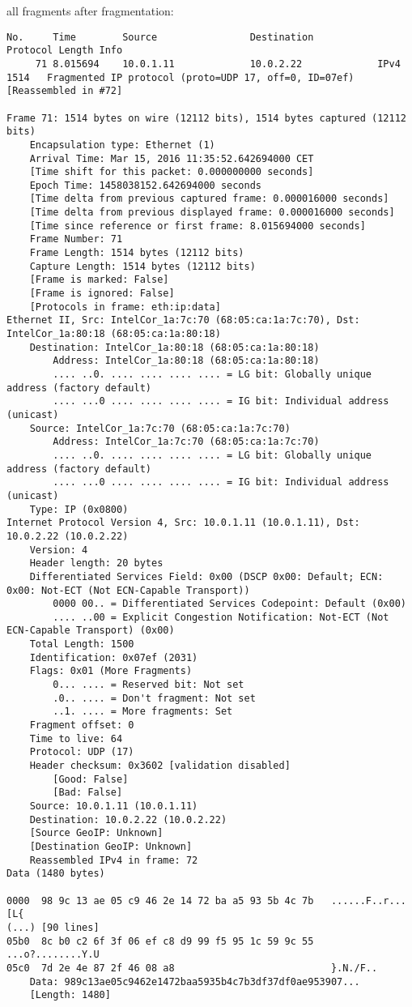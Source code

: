 all fragments after fragmentation:
\begin{lstlisting}
No.     Time        Source                Destination           Protocol Length Info
     71 8.015694    10.0.1.11             10.0.2.22             IPv4     1514   Fragmented IP protocol (proto=UDP 17, off=0, ID=07ef) [Reassembled in #72]

Frame 71: 1514 bytes on wire (12112 bits), 1514 bytes captured (12112 bits)
    Encapsulation type: Ethernet (1)
    Arrival Time: Mar 15, 2016 11:35:52.642694000 CET
    [Time shift for this packet: 0.000000000 seconds]
    Epoch Time: 1458038152.642694000 seconds
    [Time delta from previous captured frame: 0.000016000 seconds]
    [Time delta from previous displayed frame: 0.000016000 seconds]
    [Time since reference or first frame: 8.015694000 seconds]
    Frame Number: 71
    Frame Length: 1514 bytes (12112 bits)
    Capture Length: 1514 bytes (12112 bits)
    [Frame is marked: False]
    [Frame is ignored: False]
    [Protocols in frame: eth:ip:data]
Ethernet II, Src: IntelCor_1a:7c:70 (68:05:ca:1a:7c:70), Dst: IntelCor_1a:80:18 (68:05:ca:1a:80:18)
    Destination: IntelCor_1a:80:18 (68:05:ca:1a:80:18)
        Address: IntelCor_1a:80:18 (68:05:ca:1a:80:18)
        .... ..0. .... .... .... .... = LG bit: Globally unique address (factory default)
        .... ...0 .... .... .... .... = IG bit: Individual address (unicast)
    Source: IntelCor_1a:7c:70 (68:05:ca:1a:7c:70)
        Address: IntelCor_1a:7c:70 (68:05:ca:1a:7c:70)
        .... ..0. .... .... .... .... = LG bit: Globally unique address (factory default)
        .... ...0 .... .... .... .... = IG bit: Individual address (unicast)
    Type: IP (0x0800)
Internet Protocol Version 4, Src: 10.0.1.11 (10.0.1.11), Dst: 10.0.2.22 (10.0.2.22)
    Version: 4
    Header length: 20 bytes
    Differentiated Services Field: 0x00 (DSCP 0x00: Default; ECN: 0x00: Not-ECT (Not ECN-Capable Transport))
        0000 00.. = Differentiated Services Codepoint: Default (0x00)
        .... ..00 = Explicit Congestion Notification: Not-ECT (Not ECN-Capable Transport) (0x00)
    Total Length: 1500
    Identification: 0x07ef (2031)
    Flags: 0x01 (More Fragments)
        0... .... = Reserved bit: Not set
        .0.. .... = Don't fragment: Not set
        ..1. .... = More fragments: Set
    Fragment offset: 0
    Time to live: 64
    Protocol: UDP (17)
    Header checksum: 0x3602 [validation disabled]
        [Good: False]
        [Bad: False]
    Source: 10.0.1.11 (10.0.1.11)
    Destination: 10.0.2.22 (10.0.2.22)
    [Source GeoIP: Unknown]
    [Destination GeoIP: Unknown]
    Reassembled IPv4 in frame: 72
Data (1480 bytes)

0000  98 9c 13 ae 05 c9 46 2e 14 72 ba a5 93 5b 4c 7b   ......F..r...[L{
(...) [90 lines]
05b0  8c b0 c2 6f 3f 06 ef c8 d9 99 f5 95 1c 59 9c 55   ...o?........Y.U
05c0  7d 2e 4e 87 2f 46 08 a8                           }.N./F..
    Data: 989c13ae05c9462e1472baa5935b4c7b3df37df0ae953907...
    [Length: 1480]
\end{lstlisting}


